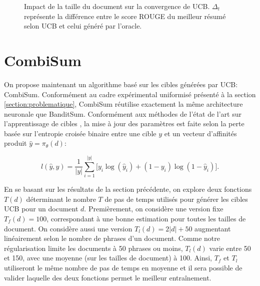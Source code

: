 \begin{figure}[h!]
    \caption{Impact de la taille du document sur la convergence de UCB.
    $\Delta_t$ représente la différence entre le score ROUGE du meilleur résumé selon UCB et 
    celui généré par l'oracle.}
    \label{fig:bandit_combi_doc_len}
\end{figure}


\section{CombiSum}
\label{sec:combisum}

On propose maintenant un algorithme basé sur les cibles 
générées par UCB: CombiSum.
Conformément au cadre expérimental uniformisé présenté à la section 
\ref{section:problematique},
CombiSum réutilise exactement la même architecture neuronale que BanditSum.
Conformément aux méthodes de l'état de l'art sur l'apprentissage 
de cibles \citep{liu2019text}, la mise à jour des paramètres est faite selon la 
perte basée sur l'entropie croisée binaire entre une cible $y$
et un vecteur d'affinités produit $\hat{y} = \pi_\theta(d)$:

\begin{equation}
    l(\hat{y}, y) = \frac{1}{|y|} \sum_{i=1}^{|y|}\big[y_i \log(\hat{y}_i) + (1 - y_i) \log(1 - \hat{y}_i) \big].
    \label{eq:bce}
\end{equation}

En se basant sur les résultats de la section précédente, on explore deux 
fonctions $T(d)$ déterminant le nombre $T$ de pas de temps utilisés pour 
générer les cibles UCB pour un document $d$.
Premièrement, on considère une version fixe $T_f(d)=100$, correspondant à une 
bonne estimation pour toutes les tailles de document.
On considère aussi une version $T_l(d)=2|d| + 50$ augmentant linéairement selon 
le nombre de phrases d'un document.
Comme notre régularisation limite les documents à 50 phrases ou moins, 
$T_l(d)$ varie entre 50 et 150, avec une moyenne (sur les tailles de document) à 
100.
Ainsi, $T_f$ et $T_l$ utiliseront le même nombre de pas de temps en moyenne 
et il sera possible de valider laquelle des deux fonctions permet 
le meilleur entraînement.

